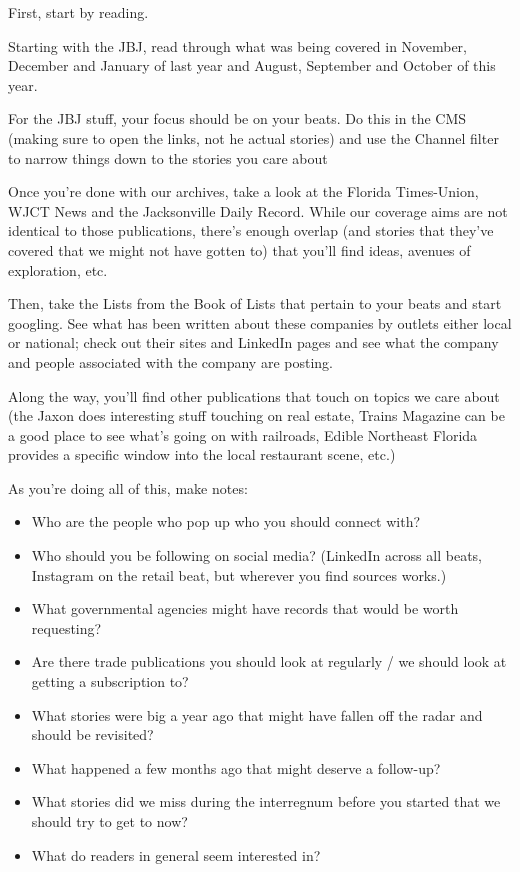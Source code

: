 \documentclass[
  12pt,
  american,
  letterpaperpaper,
  extrafontsizes,onecolumn,openright
  ]{memoir}
\providecommand{\tightlist}{%
  \setlength{\itemsep}{0pt}\setlength{\parskip}{0pt}}
\begin{document}
First, start by reading.

Starting with the JBJ, read through what was being covered in November, December and January of last year and August, September and October of this year.

For the JBJ stuff, your focus should be on your beats. Do this in the CMS (making sure to open the links, not he actual stories) and use the Channel filter to narrow things down to the stories you care about

Once you're done with our archives, take a look at the Florida Times-Union, WJCT News and the Jacksonville Daily Record. While our coverage aims are not identical to those publications, there's enough overlap (and stories that they've covered that we might not have gotten to) that you'll find ideas, avenues of exploration, etc.

Then, take the Lists from the Book of Lists that pertain to your beats and start googling. See what has been written about these companies by outlets either local or national; check out their sites and LinkedIn pages and see what the company and people associated with the company are posting.

Along the way, you'll find other publications that touch on topics we care about (the Jaxon does interesting stuff touching on real estate, Trains Magazine can be a good place to see what's going on with railroads, Edible Northeast Florida provides a specific window into the local restaurant scene, etc.)

As you're doing all of this, make notes:

\begin{itemize}
\tightlist
\item
  Who are the people who pop up who you should connect with?
\item
  Who should you be following on social media? (LinkedIn across all beats, Instagram on the retail beat, but wherever you find sources works.)
\item
  What governmental agencies might have records that would be worth requesting?
\item
  Are there trade publications you should look at regularly / we should look at getting a subscription to?
\item
  What stories were big a year ago that might have fallen off the radar and should be revisited?
\item
  What happened a few months ago that might deserve a follow-up?
\item
  What stories did we miss during the interregnum before you started that we should try to get to now?
\item
  What do readers in general seem interested in?
\end{itemize}
\end{document}
